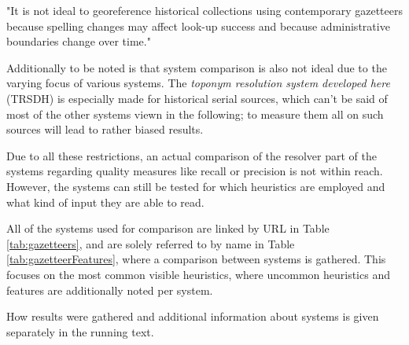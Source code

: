 \documentclass[11pt]{article}
\begin{document}
"It is not ideal to georeference historical collections using contemporary gazetteers because spelling changes may affect look-up success and because administrative boundaries change over time." \cite{tobin10}

Additionally to be noted is that system comparison is also not ideal due to the varying focus of various systems. The \emph{toponym resolution system developed here} (TRSDH) is especially made for historical serial sources, which can't be said of most of the other systems viewn in the following; to measure them all on such sources will lead to rather biased results.

Due to all these restrictions, an actual comparison of the resolver part of the systems regarding quality measures like recall or precision is not within reach. However, the systems can still be tested for which heuristics are employed and what kind of input they are able to read.

All of the systems used for comparison are linked by URL in Table \ref{tab:gazetteers}, and are solely referred to by name in Table \ref{tab:gazetteerFeatures}, where a comparison between systems is gathered. This focuses on the most common visible heuristics, where uncommon heuristics and features are additionally noted per system.

How results were gathered and additional information about systems is given separately in the running text.\\
\end{document}
